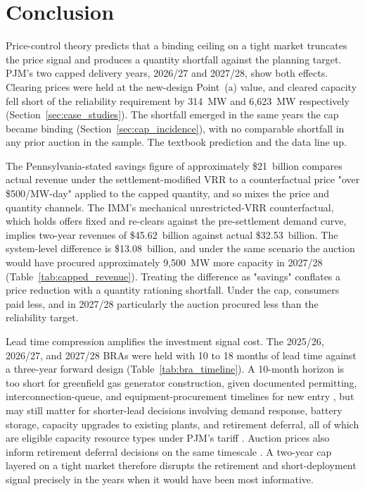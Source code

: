 
\section{Conclusion}
\label{sec:conclusion}

Price-control theory predicts that a binding ceiling on a
tight market truncates the price signal and produces a quantity
shortfall against the planning target. PJM's two capped delivery
years, 2026/27 and 2027/28, show both effects. Clearing prices were
held at the new-design Point~(a) value, and cleared capacity fell
short of the reliability requirement by 314~MW and 6{,}623~MW
respectively (Section~\ref{sec:case_studies}). The shortfall
emerged in the same years the cap became binding
(Section~\ref{sec:cap_incidence}), with no comparable shortfall in
any prior auction in the sample. The textbook prediction and the
data line up.

The Pennsylvania-stated savings figure of approximately
\$21~billion compares actual revenue under the settlement-modified
VRR to a counterfactual price "over \$500/MW-day"
\citep{Shapiro2025_press_release} applied to the capped quantity, and
so mixes the price and quantity channels. The IMM's mechanical
unrestricted-VRR counterfactual, which holds offers fixed and
re-clears against the pre-settlement demand curve, implies two-year
revenues of \$45.62~billion against actual \$32.53~billion. The
system-level difference is \$13.08~billion, and under the same
scenario the auction would have procured approximately 9{,}500~MW
more capacity in 2027/28 (Table~\ref{tab:capped_revenue}). Treating
the difference as "savings" conflates a price reduction with a
quantity rationing shortfall. Under the cap, consumers paid less,
and in 2027/28 particularly the auction procured less than the
reliability target.

Lead time compression amplifies the investment signal cost. The
2025/26, 2026/27, and 2027/28 BRAs were held with 10 to 18 months of
lead time against a three-year forward design
(Table~\ref{tab:bra_timeline}). A 10-month horizon is too short for
greenfield gas generator construction, given documented permitting,
interconnection-queue, and equipment-procurement timelines for new entry \citep{Brattle2025_cone, PJM2026_shortfall_report},
but may still matter for shorter-lead decisions involving demand
response, battery storage, capacity upgrades to existing plants,
and retirement deferral, all of which are eligible capacity resource
types under PJM's tariff \citep{PJM_Manual18}. Auction prices also
inform retirement deferral decisions on the same timescale
\citep{Cramton2005_capacity}. A two-year cap layered on a
tight market therefore disrupts the retirement and short-deployment
signal precisely in the years when it would have been most
informative.

